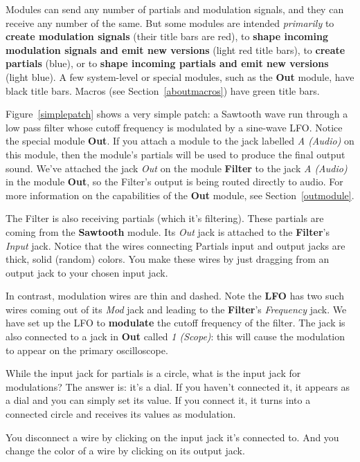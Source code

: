 \documentclass{article}
\begin{document}
Modules can send any number of partials and modulation signals, and they can receive any number of the same.  But some modules are intended {\it primarily} to {\bf create modulation signals} (their title bars are red), to {\bf shape incoming modulation signals and emit new versions} (light red title bars), to {\bf create partials} (blue), or to {\bf shape incoming partials and emit new versions} (light blue).  A few system-level or special modules, such as the {\bf Out} module, have black title bars.  Macros (see Section~\ref{aboutmacros}) have green title bars.

Figure~\ref{simplepatch} shows a very simple patch: a Sawtooth wave run through a low pass filter whose cutoff frequency is modulated by a sine-wave LFO.   Notice the special module {\bf Out}.  If you attach a module to the jack labelled {\it A (Audio)} on this module, then the module's partials will be used to produce the final output sound.  We've attached the jack {\it Out} on the module {\bf Filter} to the jack {\it A (Audio)} in the module {\bf Out}, so the Filter's output is being routed directly to audio.   For more information on the capabilities of the {\bf Out} module, see Section~\ref{outmodule}.

The Filter is also receiving partials (which it's filtering).  These partials are coming from the {\bf Sawtooth} module.  Its {\it Out} jack is attached to the {\bf Filter}'s {\it Input} jack.  Notice that the wires connecting Partials input and output jacks are thick, solid (random) colors.  You make these wires by just dragging from an output jack to your chosen input jack.

In contrast, modulation wires are thin and dashed.  Note the {\bf LFO} has two such wires coming out of its {\it Mod} jack and leading to the {\bf Filter}'s {\it Frequency} jack.  We have set up the LFO to {\bf modulate} the cutoff frequency of the filter.
The jack is also connected to a jack in {\bf Out} called {\it 1 (Scope)}: this will cause the modulation to appear on the primary oscilloscope.  

While the input jack for partials is a circle, what is the input jack for modulations?  The answer is: it's a dial.  If you haven't connected it, it appears as a dial and you can simply set its value.  If you connect it, it turns into a connected circle and receives its values as modulation. 

You disconnect a wire by clicking on the input jack it's connected to.  And you change the color of a wire by clicking on its output jack.
\end{document}
